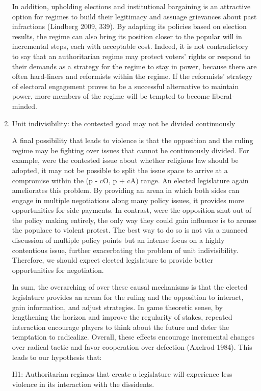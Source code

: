 \documentclass[12pt]{article}
\begin{document}
\begin{enumerate}
In addition, upholding elections and institutional bargaining is an attractive option for regimes to build their legitimacy and assuage grievances about past infractions (Lindberg 2009, 339). By adapting its policies based on election results, the regime can also bring its position closer to the popular will in incremental steps, each with acceptable cost. Indeed, it is not contradictory to say that an authoritarian regime may protect voters’ rights or respond to their demands as a strategy for the regime to stay in power, because there are often hard-liners and reformists within the regime. If the reformists’ strategy of electoral engagement proves to be a successful alternative to maintain power, more members of the regime will be tempted to become liberal-minded.

\item Unit indivisibility: the contested good may not be divided continuously

A final possibility that leads to violence is that the opposition and the ruling regime may be fighting over issues that cannot be continuously divided. For example, were the contested issue about whether religious law should be adopted, it may not be possible to split the issue space to arrive at a compromise within the (p - cO, p + cA) range. An elected legislature again ameliorates this problem. By providing an arena in which both sides can engage in multiple negotiations along many policy issues, it provides more opportunities for side payments. In contrast, were the opposition shut out of the policy making entirely, the only way they could gain influence is to arouse the populace to violent protest. The best way to do so is not via a nuanced discussion of multiple policy points but an intense focus on a highly contentious issue, further exacerbating the problem of unit indivisibility. Therefore, we should expect elected legislature to provide better opportunities for negotiation.

In sum, the overarching of over these causal mechanisms is that the elected legislature provides an arena for the ruling and the opposition to interact, gain information, and adjust strategies. In game theoretic sense, by lengthening the horizon and improve the regularity of stakes, repeated interaction encourage players to think about the future and deter the temptation to radicalize. Overall, these effects encourage incremental changes over radical tactic and favor cooperation over defection (Axelrod 1984). This leads to our hypothesis that:

H1: Authoritarian regimes that create a legislature will experience less violence in its interaction with the dissidents.
\end{enumerate}
\end{document}

